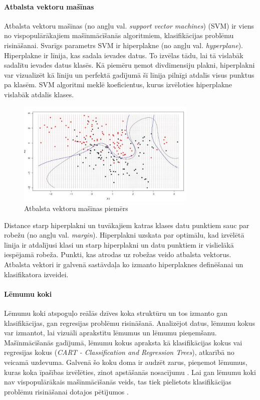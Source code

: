 \paragraph{Atbalsta vektoru mašīnas}
\hfill\par
Atbalsta vektoru mašīnas (no angļu val. \textit{support vector machines}) (SVM) ir viens no vispopulārākajiem mašīnmācīšanās algoritmiem, klasifikācijas problēmu risināšanai. Svarīgs parametrs SVM ir hiperplakne (no angļu val. \textit{hyperplane}). Hiperplakne ir līnija, kas sadala ievades datus. To izvēlas tādu, lai tā vislabāk sadalītu ievades datus klasēs. Kā piemēru ņemot divdimensiju plakni, hiperplakni var vizualizēt kā līniju un perfektā gadījumā šī līnija pilnīgi atdalīs visus punktus pa klasēm. SVM algoritmi meklē koeficientus, kurus izvēloties hiperplakne vislabāk atdalīs klases. 
\begin{figure}[h]%
	\centering
	\includegraphics[height=5cm]{images/svm.png} %
	\caption{Atbalsta vektoru mašīnas piemērs}%
	\label{fig:example}%
\end{figure} 

Distance starp hiperplakni un tuvākajiem katras klases datu punktiem sauc par robežu (no angļu val. \textit{margin}). Hiperplakni uzskata par optimālu, kad izvēlētā līnija ir atdalījusi klasi un starp hiperplakni un datu punktiem ir vislielākā iespējamā robeža. Punkti, kas atrodas uz robežas veido atbalsta vektorus. Atbalsta vektori ir galvenā sastāvdaļa ko izmanto hiperplaknes definēšanai un klasifikatora izveidei.
\paragraph{Lēmumu koki}
\hfill\par
Lēmumu koki atspoguļo reālās dzīves koka struktūru un tos izmanto gan klasifikācijas, gan regresijas problēmu risināšanā. Analizējot datus, lēmumu kokus var izmantot, lai vizuāli aprakstītu lēmumus un lēmumu pieņemšanu. Mašīnmācīšanās gadījumā, lēmumu kokus apraksta kā klasifikācijas kokus vai regresijas kokus (\textit{CART - Classification and Regression Trees}), atkarībā no veicamā uzdevuma.  Galvenā šo koku doma ir audzēt zarus, pieņemot lēmumus, kuras koka īpašības izvēlēties, zinot apstāšanās nosacījumu \cite{dectree}. Lai gan lēmumu koki nav vispopulārākais mašīnmācīšanās veids, tas tiek pielietots klasifikācijas problēmu risināšanai dotajos pētījumos \cite{dectreepaper,pal2003assessment}.


